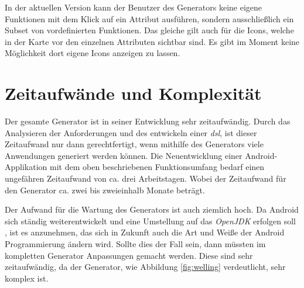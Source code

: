 In der aktuellen Version kann der Benutzer des Generators keine eigene Funktionen mit dem Klick auf ein Attribut ausführen, sondern ausschließlich ein Subset von vordefinierten Funktionen. Das gleiche gilt auch für die Icons, welche in der Karte vor den einzelnen Attributen sichtbar sind. Es gibt im Moment keine Möglichkeit dort eigene Icons anzeigen zu lassen.

\section{Zeitaufwände und Komplexität}

Der gesamte Generator ist in seiner Entwicklung sehr zeitaufwändig. Durch das Analysieren der Anforderungen und des entwickeln einer \textit{\acf{dsl}}, ist dieser Zeitaufwand nur dann gerechtfertigt, wenn mithilfe des Generators viele Anwendungen generiert werden können. Die Neuentwicklung einer Android-Applikation mit dem oben beschriebenen Funktionsumfang bedarf einen ungefähren Zeitaufwand von ca. drei Arbeitstagen. Wobei der Zeitaufwand für den Generator ca. zwei bis zweieinhalb Monate beträgt.

Der Aufwand für die Wartung des Generators ist auch ziemlich hoch. Da Android sich ständig weiterentwickelt und eine Umstellung auf das \textit{OpenJDK} erfolgen soll \cite{jdk}, ist es anzunehmen, das sich in Zukunft auch die Art und Weiße der Android Programmierung ändern wird. Sollte dies der Fall sein, dann müssten im kompletten Generator Anpassungen gemacht werden. Diese sind sehr zeitaufwändig, da der Generator, wie Abbildung \ref{fig:welling} verdeutlicht, sehr komplex ist.

